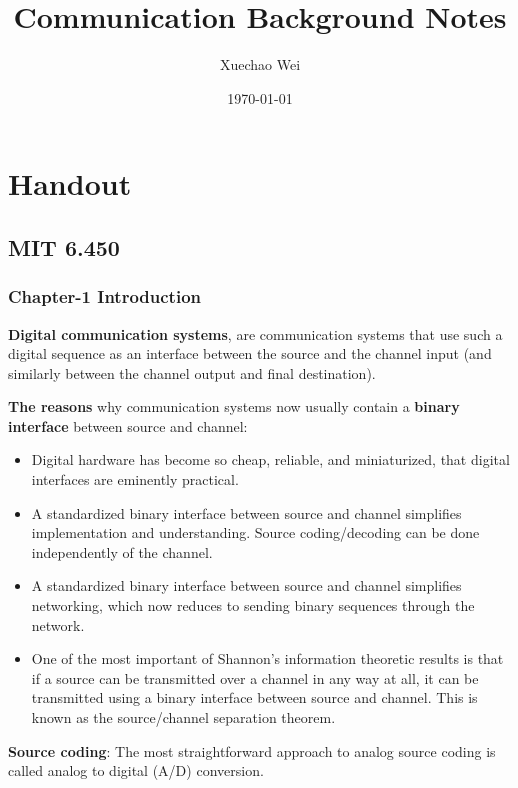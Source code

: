 \documentclass[titlepage]{article}
\numberwithin{figure}{section}
\numberwithin{equation}{section}
\begin{document}
\title{Communication Background Notes}
\author{Xuechao Wei}
\date{\today}
\maketitle

\section{Handout}

\subsection{MIT 6.450}

\subsubsection{Chapter-1 Introduction}

\textbf{Digital communication systems}, are communication systems that use such a digital sequence as an interface between the source and the channel input (and similarly between the channel output and final destination).

\textbf{The reasons} why communication systems now usually contain a \textbf{binary interface} between source and channel:

\begin{itemize}
	\item Digital hardware has become so cheap, reliable, and miniaturized, that digital interfaces are eminently practical.
	\item A standardized binary interface between source and channel simplifies implementation and understanding. Source coding/decoding can be done independently of the channel.
	\item A standardized binary interface between source and channel simplifies networking, which now reduces to sending binary sequences through the network.
	\item One of the most important of Shannon's information theoretic results is that if a source can be transmitted over a channel in any way at all, it can be transmitted using a binary interface between source and channel. This is known as the source/channel separation theorem.
\end{itemize}

\textbf{Source coding}: The most straightforward approach to analog source coding is called analog to digital (A/D) conversion. 
\end{document}
